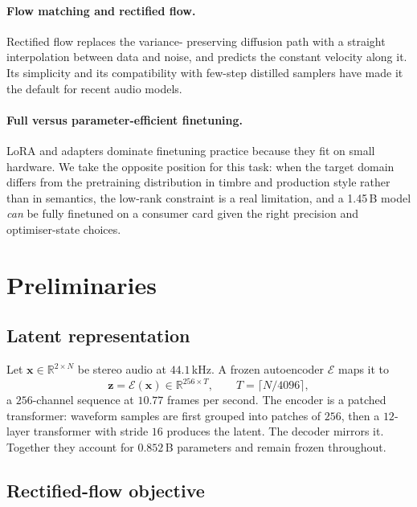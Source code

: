 \documentclass[10pt,twocolumn,letterpaper]{article}
\newcommand{\R}{\mathbb{R}}
\newcommand{\bx}{\mathbf{x}}
\newcommand{\bz}{\mathbf{z}}
\begin{document}
\paragraph{Flow matching and rectified flow.} Rectified flow replaces the variance-
preserving diffusion path with a straight interpolation between data and noise, and
predicts the constant velocity along it. Its simplicity and its compatibility with
few-step distilled samplers have made it the default for recent audio models.

\paragraph{Full versus parameter-efficient finetuning.} LoRA and adapters dominate
finetuning practice because they fit on small hardware. We take the opposite position for
this task: when the target domain differs from the pretraining distribution in timbre and
production style rather than in semantics, the low-rank constraint is a real limitation,
and a 1.45\,B model \emph{can} be fully finetuned on a consumer card given the right
precision and optimiser-state choices.

\section{Preliminaries}

\subsection{Latent representation}

Let $\bx \in \R^{2 \times N}$ be stereo audio at $44.1$\,kHz. A frozen autoencoder
$\mathcal{E}$ maps it to
\begin{equation}
\bz = \mathcal{E}(\bx) \in \R^{256 \times T}, \qquad T = \lceil N / 4096 \rceil ,
\end{equation}
a $256$-channel sequence at $10.77$ frames per second. The encoder is a patched
transformer: waveform samples are first grouped into patches of $256$, then a
$12$-layer transformer with stride $16$ produces the latent. The decoder mirrors it.
Together they account for $0.852$\,B parameters and remain frozen throughout.

\subsection{Rectified-flow objective}
\end{document}
